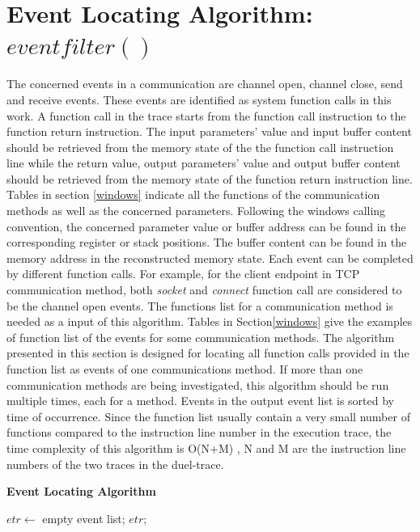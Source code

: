 \section{Event Locating Algorithm: $eventfilter\left( \right)$}
The concerned events in a communication are channel open, channel close, send and receive events. These events are identified as system function calls in this work.  A function call in the trace starts from the function call instruction to the function return instruction. The input parameters' value and input buffer content should be retrieved from the memory state of the the function call instruction line while the return value, output parameters' value and output buffer content should be retrieved from the memory state of the function return instruction line. Tables in section \ref{windows} indicate all the functions of the communication methods as well as the concerned parameters. Following the windows calling convention, the concerned parameter value or buffer address can be found in the corresponding register or stack positions. The buffer content can be found in the memory address in the reconstructed memory state. Each event can be completed by different function calls. For example, for the client endpoint in TCP communication method, both  \textit{socket} and \textit{connect} function call are considered to be the channel open events. The functions list for a communication method is needed as a input of this algorithm. Tables in Section\ref{windows} give the examples of function list of the events for some communication methods. The algorithm presented in this section is designed for locating all function calls provided in the function list as events of one communications method. If more than one communication methods are being investigated, this algorithm should be run multiple times, each for a method. Events in the output event list is sorted by time of occurrence. Since the function list usually contain a very small number of functions compared to the instruction line number in the execution trace, the time complexity of this algorithm is O(N+M) , N and M are the instruction line numbers of the two traces in the duel-trace.

\begin{algorithm}[H]
\DontPrintSemicolon
\caption{{\bf Event Locating Algorithm} \label{eventLocAlg}}
$etr \leftarrow $ empty event list;\; 
\KwRet $etr$;\;
\end{algorithm} 

